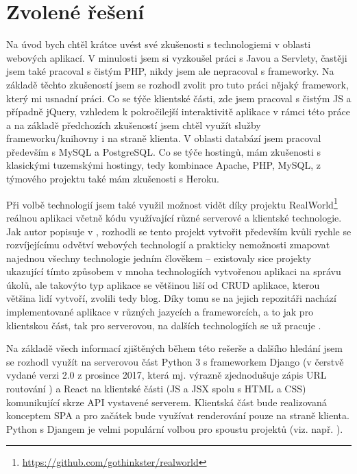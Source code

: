     \section{Zvolené řešení}\label{reseni}
    Na úvod bych chtěl krátce uvést své zkušenosti s technologiemi v oblasti webových aplikací. V minulosti jsem si vyzkoušel práci s Javou a Servlety, častěji jsem také pracoval s čistým PHP, nikdy jsem ale nepracoval s frameworky. Na základě těchto zkušeností jsem se rozhodl zvolit pro tuto práci nějaký framework, který mi usnadní práci. Co se týče klientské části, zde jsem pracoval s čistým JS a případně jQuery, vzhledem k pokročilejší interaktivitě aplikace v rámci této práce a na základě předchozích zkušeností jsem chtěl využít služby frameworku/knihovny i na straně klienta. V oblasti databází jsem pracoval především s MySQL a PostgreSQL. Co se týče hostingů, mám zkušenosti s klasickými tuzemskými hostingy, tedy kombinace Apache, PHP, MySQL, z týmového projektu také mám zkušenosti s Heroku.
    
    Při volbě technologií jsem také využil možnost vidět díky projektu RealWorld\footnote{\url{https://github.com/gothinkster/realworld}} reálnou aplikaci včetně kódu využívající různé serverové a klientské technologie. Jak autor popisuje v \cite{realworld}, rozhodli se tento projekt vytvořit především kvůli rychle se rozvíjejícímu odvětví webových technologií a prakticky nemožnosti zmapovat najednou všechny technologie jedním člověkem -- existovaly sice projekty ukazující tímto způsobem v mnoha technologiích vytvořenou aplikaci na správu úkolů, ale takovýto typ aplikace se většinou liší od CRUD aplikace, kterou většina lidí vytvoří, zvolili tedy blog. Díky tomu se na jejich repozitáři nachází implementované aplikace v různých jazycích a frameworcích, a to jak pro klientskou část, tak pro serverovou, na dalších technologiích se už pracuje \cite{realworld-git}.
    
    Na základě všech informací zjištěných během této rešerše a dalšího hledání jsem se rozhodl využít na serverovou část Python 3 s frameworkem Django (v čerstvě vydané verzi 2.0 z prosince 2017, která mj. výrazně zjednodušuje zápis URL routování \cite{django2}) a React na klientské části (JS a JSX spolu s HTML a CSS) komunikující skrze API vystavené serverem. Klientská část bude realizovaná konceptem SPA a pro začátek bude využívat renderování pouze na straně klienta. Python s Djangem je velmi populární volbou pro spoustu projektů (viz. např. \cite{stack-stats18}).
    
